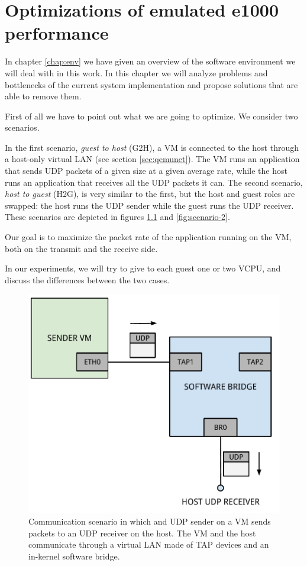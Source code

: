 \chapter{Optimizations of emulated e1000 performance}
\label{cha:e1000-opt}
In chapter \ref{chap:env} we have given an overview of the software environment we will deal with in this work.
In this chapter we will analyze problems and bottlenecks of the current system implementation and propose solutions that are able
to remove them.

\vspace{0.5cm}

First of all we have to point out what we are going to optimize. We consider two scenarios.

In the first scenario, \emph{guest to host} (G2H), a VM is connected to the host through a host-only virtual LAN (see 
section \ref{sec:qemunet}). The VM runs an application that sends UDP packets of a given size at a given average rate, while 
the host runs an application that receives all the UDP packets it can.
The second scenario, \emph{host to guest} (H2G), is very similar to the first, but the host and guest roles are swapped: the host runs 
the UDP sender while the guest runs the UDP receiver. These scenarios are depicted in figures \ref{fig:scenario-1} and \ref{fig:scenario-2}.

Our goal is to maximize the packet rate of the application running on the VM, both on the transmit and the receive side.

\vspace{0.5cm}

In our experiments, we will try to give to each guest one or two VCPU, and discuss the differences between the two cases.

\begin{figure}[bt]
\centering
\includegraphics[scale = 0.60]{scenario-1.pdf}
\caption{Communication scenario in which and UDP sender on a VM sends packets to an UDP receiver on the host. The VM and the host
	communicate through a virtual LAN made of TAP devices and an in-kernel software bridge.}
\label{fig:scenario-1}
\end{figure}

